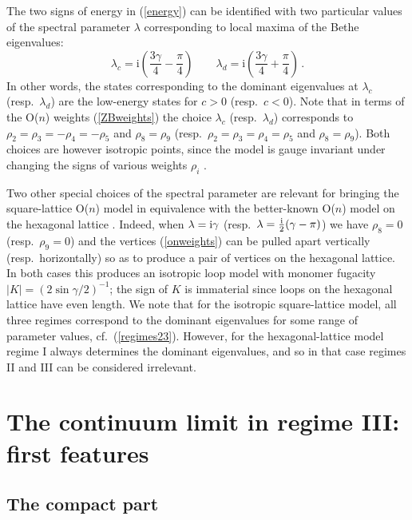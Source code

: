 \documentclass[11pt]{article}
\begin{document}
The two signs of energy in (\ref{energy}) can be identified with two particular values of the spectral parameter $\lambda$ corresponding to local maxima of the Bethe eigenvalues:
%
\begin{equation}
 \lambda_c = \mathrm{i}\left( \frac{3 \gamma}{4} - \frac{\pi}{4} \right) \qquad \lambda_d = \mathrm{i}\left( \frac{3 \gamma}{4} + \frac{\pi}{4} \right) \,.
 \label{lambdacd}
\end{equation}
%
%
In other words, the states corresponding to the dominant eigenvalues at $\lambda_c$ (resp.\ $\lambda_d$) are the low-energy states for $c>0$ (resp.\ $c<0$).
Note that in terms of the O($n$) weights (\ref{ZBweights}) the choice $\lambda_c$ (resp.\ $\lambda_d$) corresponds to
$\rho_2 = \rho_3 = -\rho_4 = -\rho_5$ and $\rho_8 = \rho_9$
(resp.\ $\rho_2 = \rho_3 = \rho_4 = \rho_5$ and $\rho_8 = \rho_9$).
Both choices are however isotropic points, since the model is gauge invariant under changing the signs of various weights $\rho_i$ \cite{BloteNienhuis89}.

Two other special choices of the spectral parameter are relevant for bringing the square-lattice O($n$) model in equivalence with the better-known
O($n$) model on the hexagonal lattice \cite{Nienhuis82}. Indeed, when $\lambda = {\rm i} \gamma$  (resp.\ $\lambda = \frac{\rm i}{2} (\gamma - \pi)$) we have $\rho_8 = 0$ (resp.\ $\rho_9 = 0$) and the vertices (\ref{onweights}) can be pulled apart vertically (resp.\ horizontally) so as to produce a pair of vertices on the hexagonal lattice. In both cases this produces an isotropic loop model with monomer fugacity $|K| = (2 \sin \gamma/2)^{-1}$; the sign of $K$ is immaterial since loops on the hexagonal lattice have even length. We note that for the isotropic square-lattice model, all three regimes correspond to the dominant eigenvalues for some range of parameter values, cf.~(\ref{regimes23}). However, for the hexagonal-lattice model regime I always determines the dominant eigenvalues, and so in that case regimes II and III can be considered irrelevant.

\section{The continuum limit in regime III: first features}\label{Sec:betheanalysis}

\subsection{The compact part}
\end{document}
